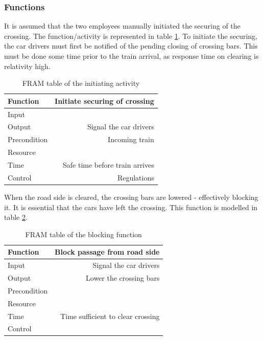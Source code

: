 \documentclass[10pt,oneside]{book}                  %
\begin{document}
\subsubsection{Functions}
It is assumed that the two employees manually initiated the securing of the crossing. The function/activity is represented in table \ref{table:function_initiate_securing}. To initiate the securing, the car drivers must first be notified of the pending closing of crossing bars. This must be done some time prior to the train arrival, as response time on clearing is relativity high.
\begin{table}[h]
\centering
    \begin{tabular}{ | l | r | }
    \hline
    Function     &  Initiate securing of crossing\\ \hline \hline
    Input        &  \\ \hline
    Output       &  Signal the car drivers\\ \hline
    Precondition &  Incoming train\\ \hline
    Resource     &  \\ \hline
    Time         &  Safe time before train arrives\\ \hline
    Control      &  Regulations\\ \hline
    \end{tabular}
\caption{FRAM table of the initiating activity}
\label{table:function_initiate_securing}
\end{table}

When the road side is cleared, the crossing bars are lowered - effectively blocking it. It is essential that the cars have left the crossing. This function is modelled in table \ref{table:function_block_from_road_side}.

\begin{table}[h]
\centering
    \begin{tabular}{ | l | r | }
    \hline
    Function     &  Block passage from road side\\ \hline \hline
    Input        &  Signal the car drivers\\ \hline
    Output       &  Lower the crossing bars\\ \hline
    Precondition &  \\ \hline
    Resource     &  \\ \hline
    Time         &  Time sufficient to clear crossing\\ \hline
    Control      &  \\ \hline
    \end{tabular}
\caption{FRAM table of the blocking function}
\label{table:function_block_from_road_side}
\end{table}
\end{document}
